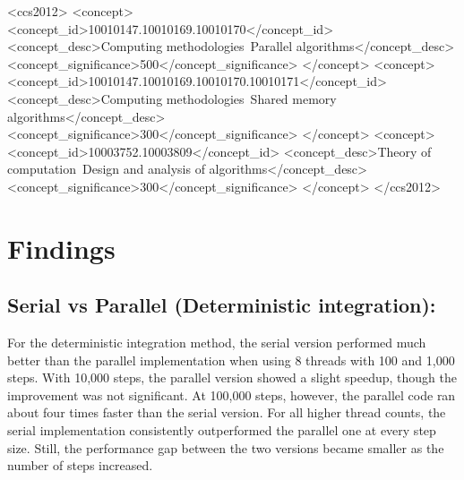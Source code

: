 \documentclass[acmtog]{acmart}
\begin{document}
\begin{CCSXML}
<ccs2012>
   <concept>
       <concept_id>10010147.10010169.10010170</concept_id>
       <concept_desc>Computing methodologies~Parallel algorithms</concept_desc>
       <concept_significance>500</concept_significance>
       </concept>
   <concept>
       <concept_id>10010147.10010169.10010170.10010171</concept_id>
       <concept_desc>Computing methodologies~Shared memory algorithms</concept_desc>
       <concept_significance>300</concept_significance>
       </concept>
   <concept>
       <concept_id>10003752.10003809</concept_id>
       <concept_desc>Theory of computation~Design and analysis of algorithms</concept_desc>
       <concept_significance>300</concept_significance>
       </concept>
 </ccs2012>
\end{CCSXML}



\maketitle

\section{Findings}
\subsection{Serial vs Parallel (Deterministic integration): }
For the deterministic integration method, the serial version performed much better than the parallel implementation when using 8 threads with 100 and 1,000 steps. With 10,000 steps, the parallel version showed a slight speedup, though the improvement was not significant. At 100,000 steps, however, the parallel code ran about four times faster than the serial version. For all higher thread counts, the serial implementation consistently outperformed the parallel one at every step size. Still, the performance gap between the two versions became smaller as the number of steps increased.
\end{document}

